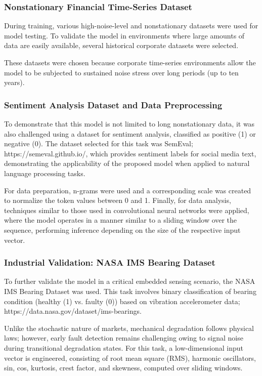 \documentclass[conference]{IEEEtran}
\begin{document}
\subsubsection{Nonstationary Financial Time-Series Dataset}

During training, various high-noise-level and nonstationary datasets were used for model testing. To validate the model in environments where large amounts of data are easily available, several historical corporate datasets were selected.

These datasets were chosen because corporate time-series environments allow the model to be subjected to sustained noise stress over long periods (up to ten years).

\subsubsection{Sentiment Analysis Dataset and Data Preprocessing}

To demonstrate that this model is not limited to long nonstationary data, it was also challenged using a dataset for sentiment analysis, classified as positive (1) or negative (0). The dataset selected for this task was SemEval; https://semeval.github.io/, which provides sentiment labels for social media text, demonstrating the applicability of the proposed model when applied to natural language processing tasks.

For data preparation, n-grams were used and a corresponding scale was created to normalize the token values between 0 and 1. Finally, for data analysis, techniques similar to those used in convolutional neural networks were applied, where the model operates in a manner similar to a sliding window over the sequence, performing inference depending on the size of the respective input vector.

\subsubsection{Industrial Validation: NASA IMS Bearing Dataset}

To further validate the model in a critical embedded sensing scenario, the NASA IMS Bearing Dataset was used. This task involves  binary classification of bearing condition (healthy (1) vs. faulty (0)) based on vibration accelerometer data; https://data.nasa.gov/dataset/ims-bearings.

Unlike the stochastic nature of markets, mechanical degradation follows physical laws; however, early fault detection remains challenging owing to signal noise during transitional degradation states. For this task, a low-dimensional input vector is engineered, consisting of root mean square (RMS), harmonic oscillators, sin, cos, kurtosis, crest factor, and skewness, computed over sliding windows.
\end{document}
